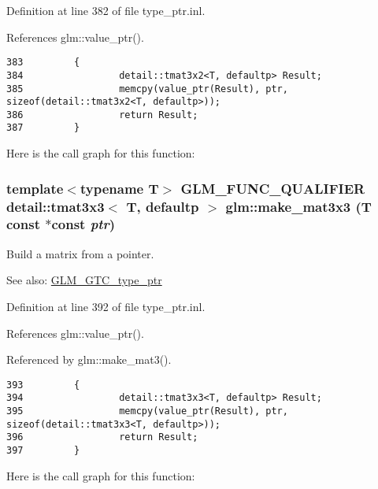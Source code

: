 Definition at line 382 of file type\_\-ptr.inl.

References glm::value\_\-ptr().

\begin{Code}\begin{verbatim}383         {
384                 detail::tmat3x2<T, defaultp> Result;
385                 memcpy(value_ptr(Result), ptr, sizeof(detail::tmat3x2<T, defaultp>));
386                 return Result;
387         }
\end{verbatim}
\end{Code}




Here is the call graph for this function:\hypertarget{group__gtc__type__ptr_g206b172296286d333b0ff92e77b28b66}{
\subsubsection[make\_\-mat3x3]{\setlength{\rightskip}{0pt plus 5cm}template$<$typename T$>$ GLM\_\-FUNC\_\-QUALIFIER detail::tmat3x3$<$ T, defaultp $>$ glm::make\_\-mat3x3 (T const $\ast$const  {\em ptr})}}
\label{group__gtc__type__ptr_g206b172296286d333b0ff92e77b28b66}


Build a matrix from a pointer. \begin{Desc}
\item[See also:]\hyperlink{group__gtc__type__ptr}{GLM\_\-GTC\_\-type\_\-ptr} \end{Desc}


Definition at line 392 of file type\_\-ptr.inl.

References glm::value\_\-ptr().

Referenced by glm::make\_\-mat3().

\begin{Code}\begin{verbatim}393         {
394                 detail::tmat3x3<T, defaultp> Result;
395                 memcpy(value_ptr(Result), ptr, sizeof(detail::tmat3x3<T, defaultp>));
396                 return Result;
397         }
\end{verbatim}
\end{Code}




Here is the call graph for this function:

